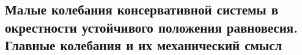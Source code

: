 

\subsection{Малые колебания консервативной системы в окрестности устойчивого положения равновесия. Главные колебания и их механический смысл}



